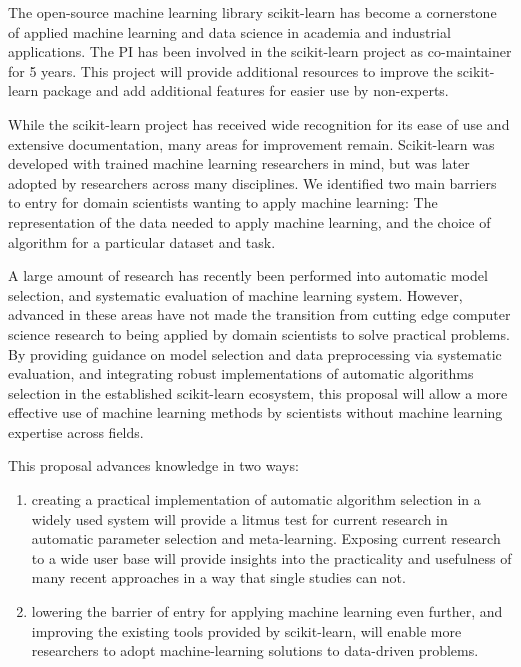 The open-source machine learning library scikit-learn has become a cornerstone of
applied machine learning and data science in academia and industrial applications.
The PI has been involved in the scikit-learn project as co-maintainer for 5 years.
This project will provide additional resources to improve the
scikit-learn package and add additional features for easier use by non-experts.

While the scikit-learn project has received wide recognition for its ease of
use and extensive documentation, many areas for improvement remain.
Scikit-learn was developed with trained machine learning researchers in mind,
but was later adopted by researchers across many disciplines.
We identified two main barriers to entry for domain scientists wanting to apply
machine learning:
The representation of the data needed to apply machine learning, and the choice
of algorithm for a particular dataset and task.

A large amount of research has recently been performed into automatic model
selection, and systematic evaluation of machine learning system.
However, advanced in these areas have not made the transition from cutting edge
computer science research to being applied by domain scientists to solve practical
problems.
By providing guidance on model selection and data preprocessing via
systematic evaluation, and integrating robust implementations of automatic
algorithms selection in the established scikit-learn ecosystem, this proposal
will allow a more effective use of machine learning methods by scientists
without machine learning expertise across fields.

This proposal advances knowledge in two ways:
\begin{enumerate}
    \item creating a practical implementation of automatic algorithm selection in a
    widely used system will provide a litmus test for current research in automatic
    parameter selection and meta-learning. Exposing current research to a wide user base
    will provide insights into the practicality and usefulness of many recent approaches
    in a way that single studies can not.
    \item lowering the barrier of entry for applying machine learning even further,
    and improving the existing tools provided by scikit-learn, will enable more
    researchers to adopt machine-learning solutions to data-driven problems.
\end{enumerate}

